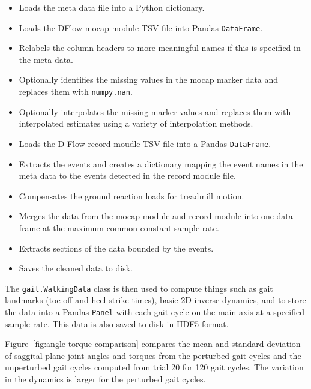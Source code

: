 \documentclass{article}
\begin{document}
\begin{itemize}
  \item Loads the meta data file into a Python dictionary.
  \item Loads the DFlow mocap module TSV file into Pandas \verb|DataFrame|.
  \item Relabels the column headers to more meaningful names if this is
    specified in the meta data.
  \item Optionally identifies the missing values in the mocap marker data and
    replaces them with \verb|numpy.nan|.
  \item Optionally interpolates the missing marker values and replaces them
    with interpolated estimates using a variety of interpolation methods.
  \item Loads the D-Flow record moudle TSV file into a Pandas \verb|DataFrame|.
  \item Extracts the events and creates a dictionary mapping the event names in
    the meta data to the events detected in the record module file.
  \item Compensates the ground reaction loads for treadmill motion.
  \item Merges the data from the mocap module and record module into one data
    frame at the maximum common constant sample rate.
  \item Extracts sections of the data bounded by the events.
  \item Saves the cleaned data to disk.
\end{itemize}

The \verb|gait.WalkingData| class is then used to compute things such as gait
landmarks (toe off and heel strike times), basic 2D inverse dynamics, and to
store the data into a Pandas \verb|Panel| with each gait cycle on the main axis
at a specified sample rate. This data is also saved to disk in HDF5 format.

Figure~\ref{fig:angle-torque-comparison} compares the mean and standard
deviation of saggital plane joint angles and torques from the perturbed gait
cycles and the unperturbed gait cycles computed from trial 20 for 120 gait
cycles. The variation in the dynamics is larger for the perturbed gait cycles.
\end{document}

